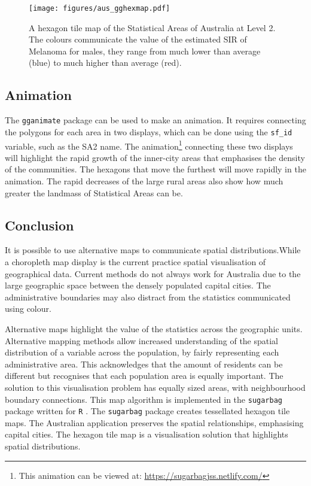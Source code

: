 \begin{figure}[h]
\centering
\texttt{[image: figures/aus\_gghexmap.pdf]}
\caption{\label{fig:melanoma-geo}A hexagon tile map of the Statistical Areas of Australia at Level 2. The colours communicate the value of the estimated SIR of Melanoma for males, they range from much lower than average (blue) to much higher than average (red).}
\end{figure}

\hypertarget{animation}{%
\subsection{Animation}\label{animation}}

The \texttt{gganimate} \citep{gganimate} package can be used to make an
animation. It requires connecting the polygons for each area in two
displays, which can be done using the \texttt{sf\_id} variable, such as
the SA2 name. The animation\footnote{This animation can be viewed at:
  \url{https://sugarbagjss.netlify.com/}} connecting these two displays
will highlight the rapid growth of the inner-city areas that emphasises
the density of the communities. The hexagons that move the furthest will
move rapidly in the animation. The rapid decreases of the large rural
areas also show how much greater the landmass of Statistical Areas can
be.

\hypertarget{conclusion-03}{%
\subsection{Conclusion}\label{conclusion-03}}

It is possible to use alternative maps to communicate spatial
distributions.While a choropleth map display is the current practice
spatial visualisation of geographical data. Current methods do not
always work for Australia due to the large geographic space between the
densely populated capital cities. The administrative boundaries may also
distract from the statistics communicated using colour.

Alternative maps highlight the value of the statistics across the
geographic units. Alternative mapping methods allow increased
understanding of the spatial distribution of a variable across the
population, by fairly representing each administrative area. This
acknowledges that the amount of residents can be different but
recognises that each population area is equally important. The solution
to this visualisation problem has equally sized areas, with
neighbourhood boundary connections. This map algorithm is implemented in
the \texttt{sugarbag} \citep{sugarbag} package written for \texttt{R}
\citep{R}. The \texttt{sugarbag} package creates tessellated hexagon
tile maps. The Australian application preserves the spatial
relationships, emphasising capital cities. The hexagon tile map is a
visualisation solution that highlights spatial distributions.

